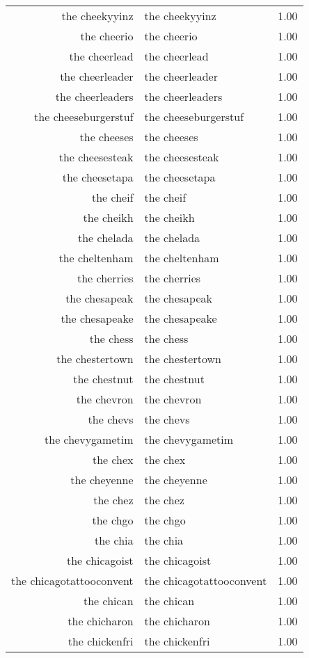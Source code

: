 \begin{table}[ht]
\begin{tabular}{rlr}
  the cheekyyinz & the cheekyyinz & 1.00 \\ 
  the cheerio & the cheerio & 1.00 \\ 
  the cheerlead & the cheerlead & 1.00 \\ 
  the cheerleader & the cheerleader & 1.00 \\ 
  the cheerleaders & the cheerleaders & 1.00 \\ 
  the cheeseburgerstuf & the cheeseburgerstuf & 1.00 \\ 
  the cheeses & the cheeses & 1.00 \\ 
  the cheesesteak & the cheesesteak & 1.00 \\ 
  the cheesetapa & the cheesetapa & 1.00 \\ 
  the cheif & the cheif & 1.00 \\ 
  the cheikh & the cheikh & 1.00 \\ 
  the chelada & the chelada & 1.00 \\ 
  the cheltenham & the cheltenham & 1.00 \\ 
  the cherries & the cherries & 1.00 \\ 
  the chesapeak & the chesapeak & 1.00 \\ 
  the chesapeake & the chesapeake & 1.00 \\ 
  the chess & the chess & 1.00 \\ 
  the chestertown & the chestertown & 1.00 \\ 
  the chestnut & the chestnut & 1.00 \\ 
  the chevron & the chevron & 1.00 \\ 
  the chevs & the chevs & 1.00 \\ 
  the chevygametim & the chevygametim & 1.00 \\ 
  the chex & the chex & 1.00 \\ 
  the cheyenne & the cheyenne & 1.00 \\ 
  the chez & the chez & 1.00 \\ 
  the chgo & the chgo & 1.00 \\ 
  the chia & the chia & 1.00 \\ 
  the chicagoist & the chicagoist & 1.00 \\ 
  the chicagotattooconvent & the chicagotattooconvent & 1.00 \\ 
  the chican & the chican & 1.00 \\ 
  the chicharon & the chicharon & 1.00 \\ 
  the chickenfri & the chickenfri & 1.00 \\ 

\end{tabular}
\end{table}
